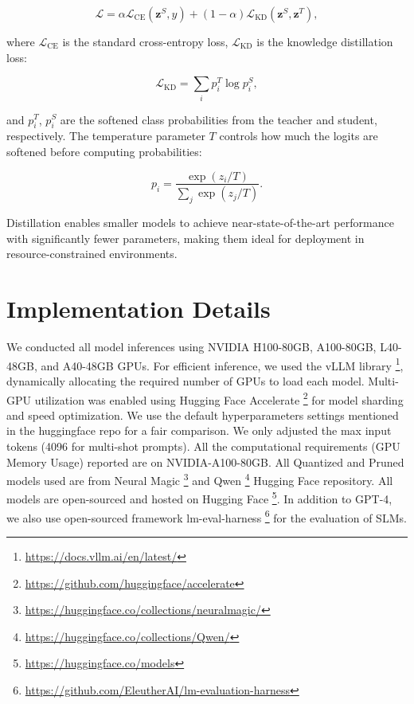 \begin{equation}
    \mathcal{L} = \alpha \mathcal{L}_{\text{CE}}(\mathbf{z}^S, y) + (1 - \alpha) \mathcal{L}_{\text{KD}}(\mathbf{z}^S, \mathbf{z}^T),
\end{equation}

where $\mathcal{L}_{\text{CE}}$ is the standard cross-entropy loss, $\mathcal{L}_{\text{KD}}$ is the knowledge distillation loss:

\begin{equation}
    \mathcal{L}_{\text{KD}} = \sum_i p^T_i \log p^S_i,
\end{equation}

and $p^T_i$, $p^S_i$ are the softened class probabilities from the teacher and student, respectively. The temperature parameter $T$ controls how much the logits are softened before computing probabilities:

\begin{equation}
    p_i = \frac{\exp(z_i / T)}{\sum_j \exp(z_j / T)}.
\end{equation}

Distillation enables smaller models to achieve near-state-of-the-art performance with significantly fewer parameters, making them ideal for deployment in resource-constrained environments.


\section{Implementation Details}
We conducted all model inferences using NVIDIA H100-80GB, A100-80GB, L40-48GB, and A40-48GB GPUs. For efficient inference, we used the vLLM library \cite{kwon2023efficientmemorymanagementlarge} \footnote{\url{https://docs.vllm.ai/en/latest/}}, dynamically allocating the required number of GPUs to load each model. Multi-GPU utilization was enabled using Hugging Face Accelerate \footnote{\url{https://github.com/huggingface/accelerate}} for model sharding and speed optimization. We use the default hyperparameters settings mentioned in the huggingface repo for a fair comparison. We only adjusted the max input tokens (4096 for multi-shot prompts). All the computational requirements (GPU Memory Usage) reported are on NVIDIA-A100-80GB. All Quantized and Pruned models used are from Neural Magic \footnote{\url{https://huggingface.co/collections/neuralmagic/}} and Qwen \footnote{\url{https://huggingface.co/collections/Qwen/}} Hugging Face repository. All models are open-sourced and hosted on Hugging Face \footnote{\url{https://huggingface.co/models}}. In addition to GPT-4, we also use open-sourced framework lm-eval-harness \footnote{\url{https://github.com/EleutherAI/lm-evaluation-harness}} for the evaluation of SLMs. \medskip

